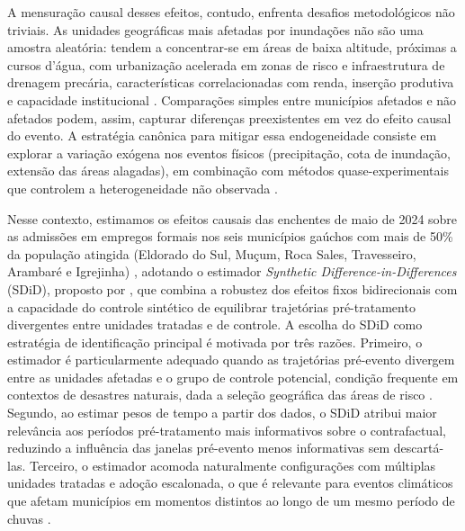 \documentclass[a4paper,12pt]{article}
\begin{document}
A mensuração causal desses efeitos, contudo, enfrenta desafios metodológicos não
triviais. As unidades geográficas mais afetadas por inundações não são uma amostra
aleatória: tendem a concentrar-se em áreas de baixa altitude, próximas a cursos d'água,
com urbanização acelerada em zonas de risco e infraestrutura de drenagem precária,
características correlacionadas com renda, inserção produtiva e capacidade institucional
\cite{botzen2019}. Comparações simples entre municípios afetados e não afetados podem,
assim, capturar diferenças preexistentes em vez do efeito causal do evento. A estratégia
canônica para mitigar essa endogeneidade consiste em explorar a variação exógena nos
eventos físicos (precipitação, cota de inundação, extensão das áreas alagadas), em
combinação com métodos quase-experimentais que controlem a heterogeneidade não
observada \cite{elsner2024}.

Nesse contexto, estimamos os efeitos causais das enchentes de maio de 2024 sobre as
admissões em empregos formais nos seis municípios gaúchos com mais de 50\% da população
atingida (Eldorado do Sul, Muçum, Roca Sales, Travesseiro, Arambaré e Igrejinha)
\cite{teixeira2024}, adotando o estimador \textit{Synthetic Difference-in-Differences} (SDiD),
proposto por , que combina a robustez dos efeitos fixos
bidirecionais com a capacidade do controle sintético de equilibrar trajetórias
pré-tratamento divergentes entre unidades tratadas e de controle. A escolha do SDiD
como estratégia de identificação principal é motivada por três razões. Primeiro, o
estimador é particularmente adequado quando as trajetórias pré-evento divergem entre as
unidades afetadas e o grupo de controle potencial, condição frequente em contextos de
desastres naturais, dada a seleção geográfica das áreas de risco
\cite{arkhangelsky2021, chaisemartin2020}. Segundo, ao estimar pesos de tempo a partir
dos dados, o SDiD atribui maior relevância aos períodos pré-tratamento mais informativos
sobre o contrafactual, reduzindo a influência das janelas pré-evento menos informativas
sem descartá-las. Terceiro, o estimador acomoda
naturalmente configurações com múltiplas unidades tratadas e adoção escalonada, o que é
relevante para eventos climáticos que afetam municípios em momentos distintos ao longo
de um mesmo período de chuvas \cite{clarke2023}.
\end{document}
